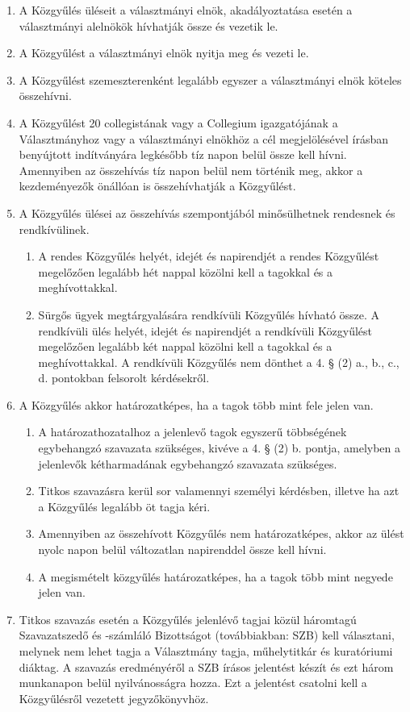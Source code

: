\documentclass{../styles/rulebook}
\begin{document}
\begin{enumerate}
	\item A Közgyűlés üléseit a választmányi elnök, akadályoztatása esetén a választmányi alelnökök hívhatják össze és vezetik le.
	\item A Közgyűlést a választmányi elnök nyitja meg és vezeti le.
	\item A Közgyűlést szemeszterenként legalább egyszer a választmányi elnök köteles összehívni.
	\item A Közgyűlést 20 collegistának vagy a Collegium igazgatójának a Választmányhoz vagy a választmányi elnökhöz a cél megjelölésével írásban benyújtott indítványára legkésőbb tíz napon belül össze kell hívni. Amennyiben az összehívás tíz napon belül nem történik meg, akkor a kezdeményezők önállóan is összehívhatják a Közgyűlést.
	\item A Közgyűlés ülései az összehívás szempontjából minősülhetnek rendesnek és rendkívülinek.
	\begin{enumerate}
		\item A rendes Közgyűlés helyét, idejét és napirendjét a rendes Közgyűlést megelőzően legalább hét nappal közölni kell a tagokkal és a meghívottakkal.
		\item Sürgős ügyek megtárgyalására rendkívüli Közgyűlés hívható össze. A rendkívüli ülés helyét, idejét és napirendjét a rendkívüli Közgyűlést megelőzően legalább két nappal közölni kell a tagokkal és a meghívottakkal. A rendkívüli Közgyűlés nem dönthet a 4. § (2) a., b., c., d. pontokban felsorolt kérdésekről.
	\end{enumerate}
	\item A Közgyűlés akkor határozatképes, ha a tagok több mint fele jelen van.
	\begin{enumerate}
		\item A határozathozatalhoz a jelenlevő tagok egyszerű többségének egybehangzó szavazata szükséges, kivéve a 4. § (2) b. pontja, amelyben a jelenlevők kétharmadának egybehangzó szavazata szükséges.
		\item Titkos szavazásra kerül sor valamennyi személyi kérdésben, illetve ha azt a Közgyűlés legalább öt tagja kéri.
		\item Amennyiben az összehívott Közgyűlés nem határozatképes, akkor az ülést nyolc napon belül változatlan napirenddel össze kell hívni.
		\item A megismételt közgyűlés határozatképes, ha a tagok több mint negyede jelen van.
	\end{enumerate}
	\item Titkos szavazás esetén a Közgyűlés jelenlévő tagjai közül háromtagú Szavazatszedő és -számláló Bizottságot (továbbiakban: SZB) kell választani, melynek nem lehet tagja a Választmány tagja, műhelytitkár és kuratóriumi diáktag. A szavazás eredményéről a SZB írásos jelentést készít és ezt három munkanapon belül nyilvánosságra hozza. Ezt a jelentést csatolni kell a Közgyűlésről vezetett jegyzőkönyvhöz.

\end{enumerate}
\end{document}
